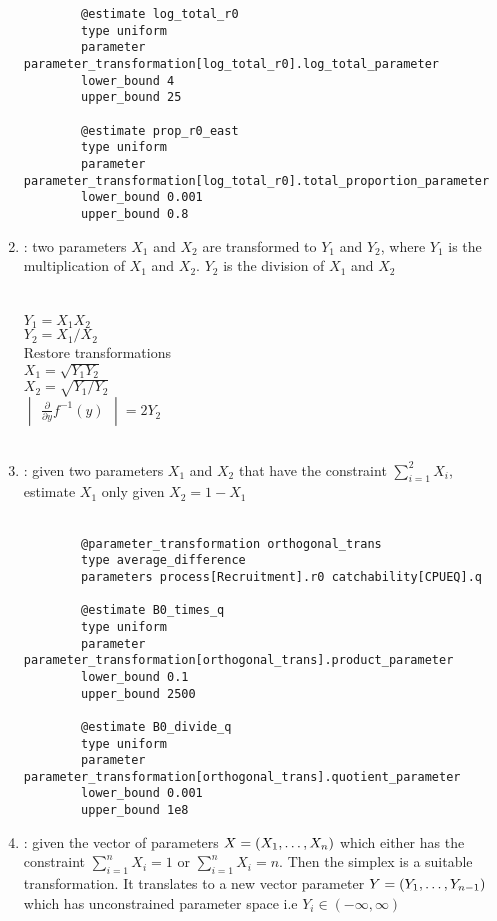 \begin{enumerate}
{{\begin{verbatim}
		@estimate log_total_r0
		type uniform
		parameter parameter_transformation[log_total_r0].log_total_parameter
		lower_bound 4
		upper_bound 25
		
		@estimate prop_r0_east
		type uniform
		parameter parameter_transformation[log_total_r0].total_proportion_parameter
		lower_bound 0.001
		upper_bound 0.8		
		\end{verbatim}}}
	
\item {} : two parameters $X_1$ and $X_2$ are transformed to $Y_1$ and $Y_2$, where $Y_1$ is the multiplication of $X_1$ and $X_2$. $Y_2$ is the division of $X_1$ and $X_2$\\
\\
\\
$Y_1 = X_1 X_2$\\
$Y_2 = X_1 / X_2$\\
Restore transformations\\
$X_1 = \sqrt{Y_1 Y_2}$\\
$X_2 = \sqrt{Y_1 / Y_2}$\\
$\begin{vmatrix} \frac{\partial}{\partial y} f^{-1}(y) \end{vmatrix} = 2Y_2$\\\\
\label{sec:Transformation-Orthogonal}

\item {} : given two parameters $X_1$ and $X_2$ that have the constraint $\sum_{i = 1}^2X_i$, estimate $X_1$ only given $X_2 = 1 - X_1$\\
\\
\label{sec:Transformation-SumToOne}
{\small{\begin{verbatim}
		@parameter_transformation orthogonal_trans
		type average_difference
		parameters process[Recruitment].r0 catchability[CPUEQ].q
		
		@estimate B0_times_q
		type uniform
		parameter parameter_transformation[orthogonal_trans].product_parameter
		lower_bound 0.1
		upper_bound 2500
		
		@estimate B0_divide_q
		type uniform
		parameter parameter_transformation[orthogonal_trans].quotient_parameter
		lower_bound 0.001
		upper_bound 1e8	
		\end{verbatim}}}

\item {} : given the vector of parameters $\boldmath{X} = (X_1, \dots, X_n)$ which either has the constraint $\sum_{i = 1}^n X_i = 1$ or $\sum_{i = 1}^n X_i = n$. Then the simplex is a suitable transformation. It translates to a new vector parameter \(\boldmath{Y} = (Y_1, \dots, Y_{n - 1})\) which has unconstrained parameter space i.e \(Y_i \in (-\infty, \infty)\)\\


\end{enumerate}
